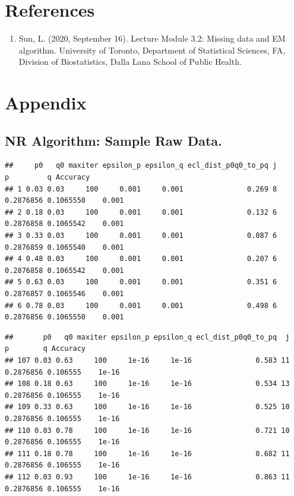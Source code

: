 \documentclass[]{article}
\providecommand{\tightlist}{%
  \setlength{\itemsep}{0pt}\setlength{\parskip}{0pt}}
\begin{document}
\section{References}\label{references}

\begin{enumerate}
\def\labelenumi{\arabic{enumi}.}
\tightlist
\item
  Sun, L. (2020, September 16). Lecture Module 3.2: Missing data and EM
  algorithm. University of Toronto, Department of Statistical Sciences,
  FA, Division of Biostatistics, Dalla Lana School of Public Health.
\end{enumerate}

\section{Appendix}\label{appendix}

\subsection{NR Algorithm: Sample Raw
Data.}\label{nr-algorithm-sample-raw-data.}

\begin{verbatim}
##     p0   q0 maxiter epsilon_p epsilon_q ecl_dist_p0q0_to_pq j         p         q Accuracy
## 1 0.03 0.03     100     0.001     0.001               0.269 8 0.2876856 0.1065550    0.001
## 2 0.18 0.03     100     0.001     0.001               0.132 6 0.2876858 0.1065542    0.001
## 3 0.33 0.03     100     0.001     0.001               0.087 6 0.2876859 0.1065540    0.001
## 4 0.48 0.03     100     0.001     0.001               0.207 6 0.2876858 0.1065542    0.001
## 5 0.63 0.03     100     0.001     0.001               0.351 6 0.2876857 0.1065546    0.001
## 6 0.78 0.03     100     0.001     0.001               0.498 6 0.2876856 0.1065550    0.001
\end{verbatim}

\begin{verbatim}
##       p0   q0 maxiter epsilon_p epsilon_q ecl_dist_p0q0_to_pq  j         p        q Accuracy
## 107 0.03 0.63     100     1e-16     1e-16               0.583 11 0.2876856 0.106555    1e-16
## 108 0.18 0.63     100     1e-16     1e-16               0.534 13 0.2876856 0.106555    1e-16
## 109 0.33 0.63     100     1e-16     1e-16               0.525 10 0.2876856 0.106555    1e-16
## 110 0.03 0.78     100     1e-16     1e-16               0.721 10 0.2876856 0.106555    1e-16
## 111 0.18 0.78     100     1e-16     1e-16               0.682 11 0.2876856 0.106555    1e-16
## 112 0.03 0.93     100     1e-16     1e-16               0.863 11 0.2876856 0.106555    1e-16
\end{verbatim}
\end{document}
